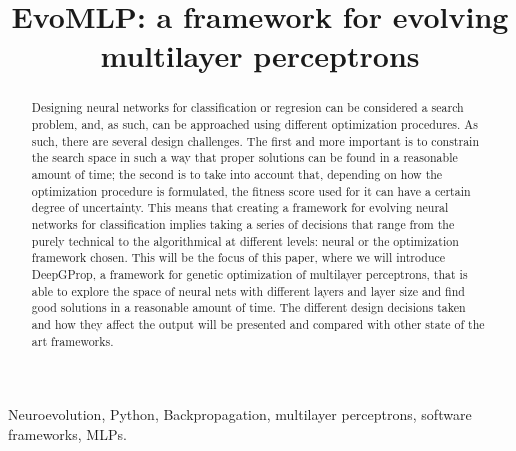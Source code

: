 \documentclass[conference]{IEEEtran}\usepackage[]{graphicx}\usepackage[]{color}
\begin{document}
%
\title{EvoMLP: a framework for evolving multilayer perceptrons}
%
\author{
  \and
  \and
}
%
\maketitle              %

\begin{abstract}
Designing neural networks for classification or regresion can be
considered a search problem, and, as such, can be approached using
different optimization procedures. As such, there are several design
challenges. The first and more important is to constrain the search
space in such a way that proper solutions can be found in a reasonable
amount of time; the second is to take into account that, depending on
how the optimization procedure is formulated, the fitness score used
for it can have a certain degree of uncertainty. This means that
creating a framework for evolving neural networks for classification
implies taking a series of decisions that range from the purely
technical to the algorithmical at different levels: neural or the
optimization framework chosen. This will be the focus of this paper,
where we will introduce DeepGProp, a framework for genetic
optimization of multilayer perceptrons, that is able to explore the
space of neural nets with different layers and layer size and find
good solutions in a reasonable amount of time. The different design
decisions taken and how they affect the output will be presented and
compared with other state of the art frameworks.

\end{abstract}

\begin{IEEEkeywords}
  Neuroevolution, Python, Backpropagation, multilayer perceptrons,
  software frameworks, MLPs.
\end{IEEEkeywords}
\end{document}

